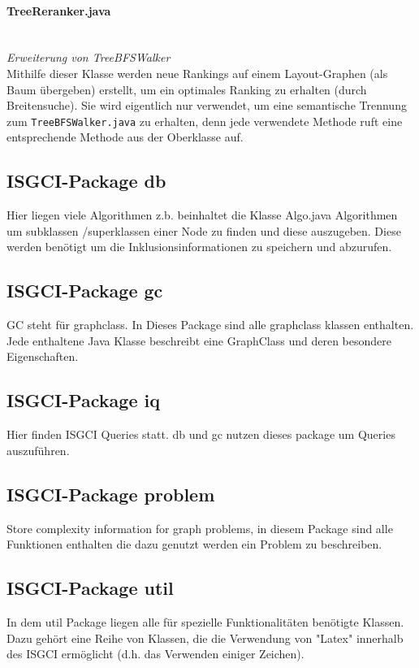 \documentclass[10pt,a4paper]{article}
\begin{document}
\paragraph{TreeReranker.java}\ \\
\emph{Erweiterung von TreeBFSWalker}\\
{\footnotesize Mithilfe dieser Klasse werden neue Rankings auf einem Layout-Graphen (als Baum übergeben) erstellt, um ein optimales Ranking zu erhalten (durch Breitensuche). Sie wird eigentlich nur verwendet, um eine semantische Trennung zum \texttt{TreeBFSWalker.java} zu erhalten, denn jede verwendete Methode ruft eine entsprechende Methode aus der Oberklasse auf.}


\subsection{ISGCI-Package db}
Hier liegen viele Algorithmen z.b. beinhaltet die Klasse Algo.java Algorithmen um subklassen /superklassen einer Node zu finden und diese auszugeben. Diese werden benötigt um die Inklusionsinformationen zu speichern und abzurufen.\\

\subsection{ISGCI-Package gc}
GC steht für graphclass. In Dieses Package sind alle graphclass klassen enthalten. Jede enthaltene Java Klasse beschreibt eine GraphClass und deren besondere Eigenschaften.\\

\subsection{ISGCI-Package iq}
Hier finden ISGCI Queries statt. db und gc nutzen dieses package um Queries auszuführen. \\

\subsection{ISGCI-Package problem}
Store complexity information for graph problems, in diesem Package sind alle Funktionen enthalten die dazu genutzt werden ein Problem zu beschreiben.\\

\subsection{ISGCI-Package util}
In dem util Package liegen alle für spezielle Funktionalitäten benötigte Klassen. Dazu gehört eine Reihe von Klassen, die die Verwendung von "Latex" innerhalb des ISGCI ermöglicht (d.h. das Verwenden einiger Zeichen).\\
\end{document}
